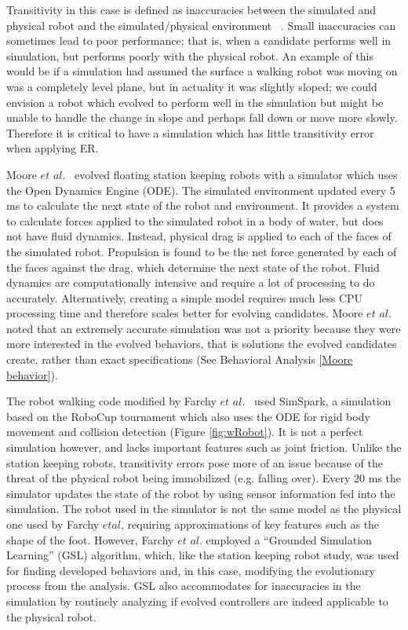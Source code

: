 \documentclass{sig-alternate}
\begin{document}
Transitivity in this case is defined as inaccuracies between the simulated and physical robot and the simulated/physical environment ~\cite{Farchy:2013:HRL:2484920.2484930}. Small inaccuracies can sometimes lead to poor performance; that is, when a candidate performs well in simulation, but performs poorly with the physical robot. An example of this would be if a simulation had assumed the surface a walking robot was moving on was a completely level plane, but in actuality it was slightly sloped; we could envision a robot which evolved to perform well in the simulation but might be unable to handle the change in slope and perhaps fall down or move more slowly. Therefore it is critical to have a simulation which has little transitivity error when applying ER.

 Moore $et$ $al.$  ~\cite{Moore:2013:ESK:2463372.2463402}evolved floating station keeping robots with a simulator which uses the Open Dynamics Engine (ODE). The simulated environment updated every 5 ms to calculate the next state of the robot and environment. It provides a system to calculate forces applied to the simulated robot in a body of water, but does not have fluid dynamics. Instead, physical drag is applied to each of the faces of the simulated robot. Propulsion is found to be the net force generated by each of the faces against the drag, which determine the next state of the robot. Fluid dynamics are computationally intensive and require a lot of processing to do accurately. Alternatively, creating a simple model requires much less CPU processing time and therefore scales better for evolving candidates. Moore $et$ $al.$ noted that an extremely accurate simulation was not a priority because they were more interested in the evolved behaviors, that is solutions the evolved candidates create, rather than exact specifications (See Behavioral Analysis \ref{Moore behavior}).
 
 The robot walking code modified by Farchy $et$ $al.$~\cite{Farchy:2013:HRL:2484920.2484930} used SimSpark, a simulation based on the RoboCup tournament which also uses the ODE for rigid body movement and collision detection (Figure \ref{fig:wRobot}). It is not a perfect simulation however, and lacks important features such as joint friction. Unlike the station keeping robots, transitivity errors pose more of an issue because of the threat of the physical robot being immobilized (e.g. falling over). Every 20 ms the simulator updates the state of the robot by using sensor information  fed into the simulation. The robot used in the simulator is not the same model as the physical one used by Farchy $et al$, requiring approximations of key features such as the shape of the foot. However, Farchy $et$ $al.$ employed a ``Grounded Simulation Learning'' (GSL) algorithm, which, like the station keeping robot study, was used for finding developed behaviors and, in this case, modifying the evolutionary process from the analysis. GSL also accommodates for inaccuracies in the simulation by routinely analyzing if evolved controllers are indeed applicable to the physical robot.
 
\end{document}
